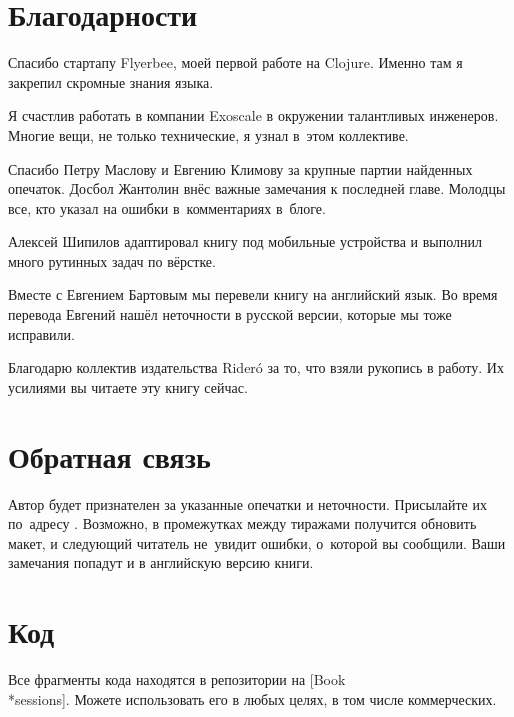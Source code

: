 \newpage

\section*{Благодарности}

Спасибо стартапу Flyerbee, моей первой работе на Clojure. Именно там я закрепил
скромные знания языка.

Я счастлив работать в компании Exoscale в окружении талантливых
инженеров. Многие вещи, не только технические, я узнал в~этом коллективе.

Спасибо Петру Маслову и Евгению Климову за крупные партии найденных
опечаток. Досбол Жантолин внёс важные замечания к последней главе. Молодцы все,
кто указал на ошибки в~комментариях в~блоге.

Алексей Шипилов адаптировал книгу под мобильные устройства и выполнил много
рутинных задач по вёрстке.

Вместе с Евгением Бартовым мы перевели книгу на английский язык. Во время
перевода Евгений нашёл неточности в русской версии, которые мы тоже исправили.

\ifx\PUBLISHER\RIDERO
Благодарю коллектив издательства Rider\'{o} за то, что взяли рукопись в
работу. Их усилиями вы читаете эту книгу сейчас.
\fi

\section*{Обратная связь}

Автор будет признателен за указанные опечатки и неточности. Присылайте их
по~адресу \EMAILLINK. Возможно, в промежутках между тиражами получится обновить
макет, и следующий читатель не~увидит ошибки, о~которой вы сообщили. Ваши
замечания попадут и в английскую версию книги.

\section*{Код}

Все фрагменты кода находятся в репозитории на
[Book\\*sessions]. Можете
использовать его в любых целях, в том числе коммерческих.
